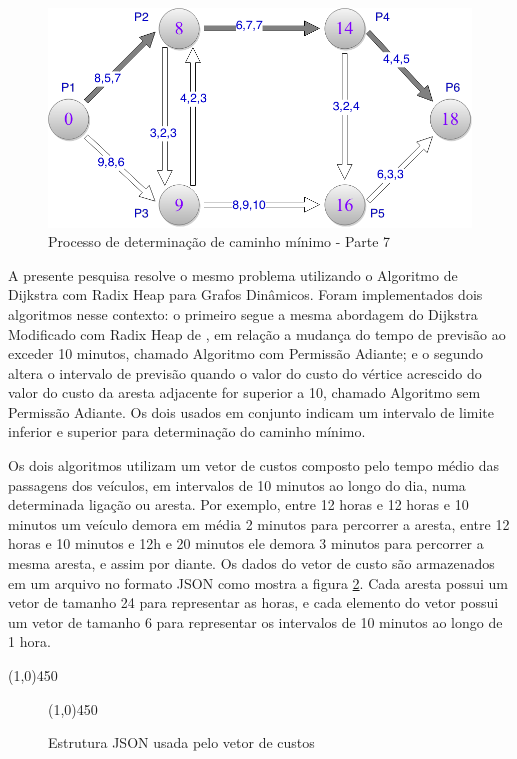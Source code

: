 \begin{figure}[htbp]
\centering
 \includegraphics[width=.50\textwidth]{chapters/fig/leo8.png}
\caption{Processo de determinação de caminho mínimo - Parte 7}
\label{fig:leo8}
\end{figure}
\FloatBarrier

A presente pesquisa resolve o mesmo problema utilizando o Algoritmo de Dijkstra com Radix Heap para Grafos Dinâmicos.
Foram implementados dois algoritmos nesse contexto: o primeiro segue a mesma abordagem do Dijkstra Modificado com Radix Heap
de \cite{leonard}, em relação a mudança do tempo de previsão ao exceder 10 minutos, chamado Algoritmo com Permissão Adiante;
e o segundo altera o intervalo de previsão quando o valor do custo do vértice acrescido do valor do custo da aresta adjacente 
for superior a 10, chamado Algoritmo sem Permissão Adiante.
Os dois usados em conjunto indicam um intervalo de limite inferior e superior para determinação do caminho mínimo.

Os dois algoritmos utilizam um vetor de custos composto pelo tempo médio das passagens dos veículos, em intervalos
de 10 minutos ao longo do dia, numa determinada ligação ou aresta. Por exemplo, entre 12 horas e 12 horas e 10 minutos um
veículo demora em média 2 minutos para percorrer a aresta, entre 12 horas e 10 minutos e 12h e 20 minutos ele demora 3 minutos
para percorrer a mesma aresta, e assim por diante. Os dados do vetor de custo são armazenados em um arquivo no formato JSON
como mostra a figura \ref{fig:tabelajson}. Cada aresta possui um vetor de tamanho 24 para representar as horas, e cada elemento
do vetor possui um vetor de tamanho 6 para representar os intervalos de 10 minutos ao longo de 1 hora.
\begin{center}
  \line(1,0){450}
\end{center}

\begin{figure}[htbp]
  \begin{center}
    \line(1,0){450}
  \end{center}
  \centering
  \caption{Estrutura JSON usada pelo vetor de custos}
  \label{fig:tabelajson}
\end{figure}
\FloatBarrier

